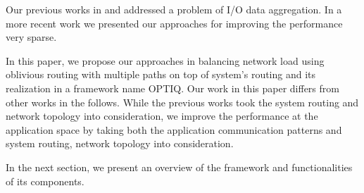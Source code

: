 Our previous works in \cite{Vishwanath:GLEAN} and \cite{SDAV:Bui2014b} addressed a problem of I/O data aggregation. In a more recent work \cite{hbui:bgq} we presented our approaches for improving the performance very sparse. 

In this paper, we propose our approaches in balancing network load using oblivious routing with multiple paths on top of system's routing and its realization in a framework name OPTIQ. Our work in this paper differs from other works in the follows. While the previous works took the system routing and network topology into consideration, we improve the performance at the application space by taking both the application communication patterns and system routing, network topology into consideration. 

In the next section, we present an overview of the framework and functionalities of its components.

